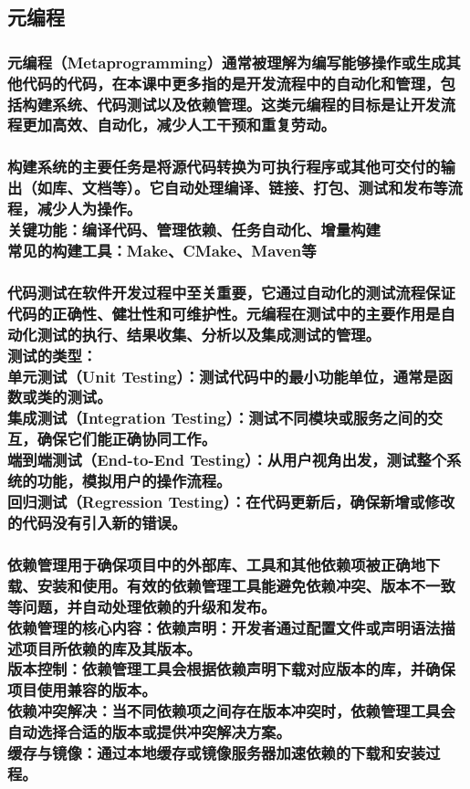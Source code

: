 \documentclass[UTF8,a4paper]{ctexart}
\begin{document}
\begin{sloppypar}
	\bigskip
	\bigskip
	\bigskip
	\bigskip
	
	\subsection{元编程}
	\subsubsection{元编程（Metaprogramming）通常被理解为编写能够操作或生成其他代码的代码，在本课中更多指的是开发流程中的自动化和管理，包括构建系统、代码测试以及依赖管理。这类元编程的目标是让开发流程更加高效、自动化，减少人工干预和重复劳动。}
	\subsubsection{构建系统的主要任务是将源代码转换为可执行程序或其他可交付的输出（如库、文档等）。它自动处理编译、链接、打包、测试和发布等流程，减少人为操作。\\关键功能：编译代码、管理依赖、任务自动化、增量构建\\常见的构建工具：Make、CMake、Maven等}
	\subsubsection{代码测试在软件开发过程中至关重要，它通过自动化的测试流程保证代码的正确性、健壮性和可维护性。元编程在测试中的主要作用是自动化测试的执行、结果收集、分析以及集成测试的管理。\\测试的类型：\\单元测试（Unit Testing）：测试代码中的最小功能单位，通常是函数或类的测试。\\集成测试（Integration Testing）：测试不同模块或服务之间的交互，确保它们能正确协同工作。\\端到端测试（End-to-End Testing）：从用户视角出发，测试整个系统的功能，模拟用户的操作流程。\\回归测试（Regression Testing）：在代码更新后，确保新增或修改的代码没有引入新的错误。}
	
	\newpage
	
	\subsubsection{依赖管理用于确保项目中的外部库、工具和其他依赖项被正确地下载、安装和使用。有效的依赖管理工具能避免依赖冲突、版本不一致等问题，并自动处理依赖的升级和发布。\\依赖管理的核心内容：依赖声明：开发者通过配置文件或声明语法描述项目所依赖的库及其版本。\\版本控制：依赖管理工具会根据依赖声明下载对应版本的库，并确保项目使用兼容的版本。\\依赖冲突解决：当不同依赖项之间存在版本冲突时，依赖管理工具会自动选择合适的版本或提供冲突解决方案。\\缓存与镜像：通过本地缓存或镜像服务器加速依赖的下载和安装过程。}
	

\end{sloppypar}
\end{document}
